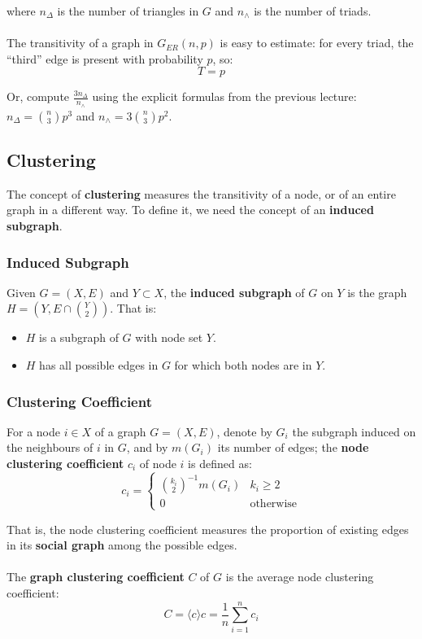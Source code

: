 \documentclass[a4paper,11pt]{article}
\begin{document}
where $n_\Delta$ is the number of triangles in $G$ and $n_\land$ is the number of triads.
\\\\
The transitivity of a graph in $G_{ER}(n,p)$ is easy to estimate:
for every triad, the ``third'' edge is present with probability $p$, so:
\[
    T = p
\]

Or, compute $\frac{3n_\Delta}{n_\land}$ using the explicit formulas from the previous lecture:
$n_\Delta = \binom{n}{3} p^3$ and $n_\land = 3 \binom{n}{3}p^2$.

\subsection{Clustering}
The concept of \textbf{clustering} measures the transitivity of a node, or of an entire graph in a different way.
To define it, we need the concept of an \textbf{induced subgraph}.

\subsubsection{Induced Subgraph}
Given $G = (X,E)$ and $Y \subset X$, the \textbf{induced subgraph} of $G$ on $Y$ is the graph $H = \left( Y, E \cap \binom{Y}{2} \right)$.
That is:
\begin{itemize}
    \item   $H$ is a subgraph of $G$ with node set $Y$.
    \item   $H$ has all possible edges in $G$ for which both nodes are in $Y$.
\end{itemize}

\subsubsection{Clustering Coefficient}
For a node $i \in X$ of a graph $G = (X,E)$, denote by $G_i$ the subgraph induced on the neighbours of $i$ in $G$, and by $m(G_i)$ its number of edges;
the \textbf{node clustering coefficient} $c_i$ of node $i$ is defined as:
\[
    c_i = 
    \begin{cases}
        \binom{k_i}{2}^{-1} m(G_i) & k_i \geq 2 \\
        0 & \text{otherwise}
    \end{cases}
\]

That is, the node clustering coefficient measures the proportion of existing edges in its \textbf{social graph} among the possible edges.
\\\\
The \textbf{graph clustering coefficient} $C$ of $G$ is the average node clustering coefficient:
\[
    C = \langle c \rangle c = \frac{1}{n} \sum^n_{i=1} c_i
\]
\end{document}
